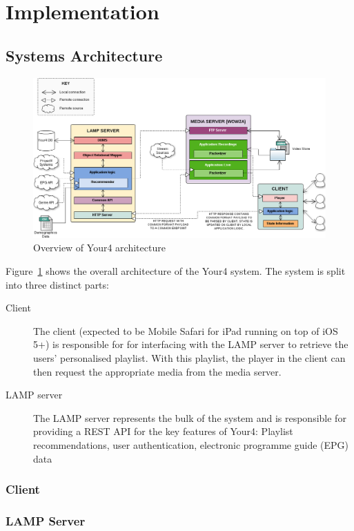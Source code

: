 \section{Implementation}

\subsection{Systems Architecture}

\begin{figure}[H]
	\centering
	\includegraphics[scale=0.4]{images/your4-architecture.png}
	\caption{Overview of Your4 architecture}
	\label{your4-architecture}
\end{figure}

Figure~\ref{your4-architecture} shows the overall architecture of the Your4 system. The system is split into three distinct parts:

\begin{description}
	\item[Client] The client (expected to be Mobile Safari for iPad running on top of iOS 5+) is responsible for for interfacing with the LAMP server to retrieve the users' personalised playlist. With this playlist, the player in the client can then request the appropriate media from the media server.
	\item[LAMP server] The LAMP server represents the bulk of the system and is responsible for providing a REST API for the key features of Your4: Playlist recommendations, user authentication, electronic programme guide (EPG) data
\end{description}

\subsubsection{Client}
\subsubsection{LAMP Server}
